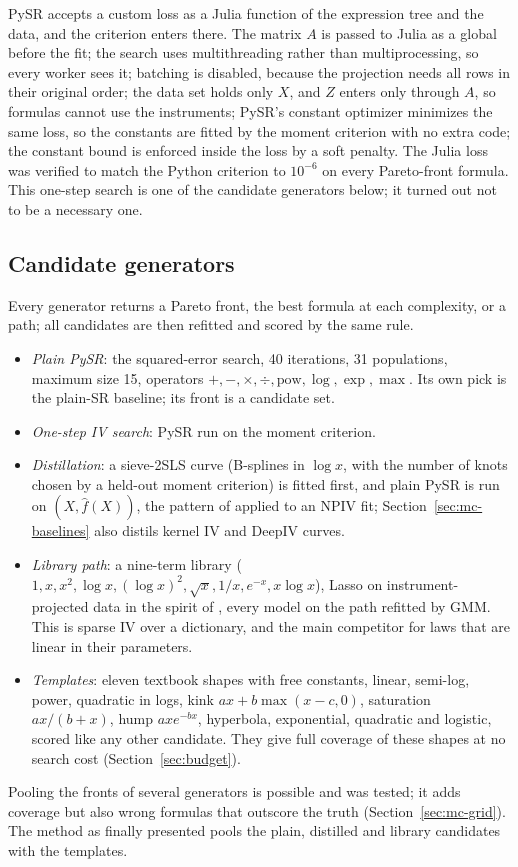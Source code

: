 PySR accepts a custom loss as a Julia function of the expression tree and the data, and the criterion enters there. The matrix $A$ is passed to Julia as a global before the fit; the search uses multithreading rather than multiprocessing, so every worker sees it; batching is disabled, because the projection needs all rows in their original order; the data set holds only $X$, and $Z$ enters only through $A$, so formulas cannot use the instruments; PySR's constant optimizer minimizes the same loss, so the constants are fitted by the moment criterion with no extra code; the constant bound is enforced inside the loss by a soft penalty. The Julia loss was verified to match the Python criterion to $10^{-6}$ on every Pareto-front formula. This one-step search is one of the candidate generators below; it turned out not to be a necessary one.

\subsection{Candidate generators}
\label{sec:generators}

Every generator returns a Pareto front, the best formula at each complexity, or a path; all candidates are then refitted and scored by the same rule.
\begin{itemize}
\item \emph{Plain PySR}: the squared-error search, 40 iterations, 31 populations, maximum size 15, operators $+, -, \times, \div, \mathrm{pow}, \log, \exp, \max$. Its own pick is the plain-SR baseline; its front is a candidate set.
\item \emph{One-step IV search}: PySR run on the moment criterion.
\item \emph{Distillation}: a sieve-2SLS curve (B-splines in $\log x$, with the number of knots chosen by a held-out moment criterion) is fitted first, and plain PySR is run on $(X, \hat f(X))$, the pattern of \citet{cranmer2020} applied to an NPIV fit; Section~\ref{sec:mc-baselines} also distils kernel IV \citep{singh2019} and DeepIV \citep{hartford2017} curves.
\item \emph{Library path}: a nine-term library ($1, x, x^2, \log x, (\log x)^2, \sqrt x, 1/x, e^{-x}, x\log x$), Lasso on instrument-projected data in the spirit of \citet{linfengli2015}, every model on the path refitted by GMM. This is sparse IV over a dictionary, and the main competitor for laws that are linear in their parameters.
\item \emph{Templates}: eleven textbook shapes with free constants, linear, semi-log, power, quadratic in logs, kink $ax + b\max(x - c, 0)$, saturation $ax/(b + x)$, hump $axe^{-bx}$, hyperbola, exponential, quadratic and logistic, scored like any other candidate. They give full coverage of these shapes at no search cost (Section~\ref{sec:budget}).
\end{itemize}
Pooling the fronts of several generators is possible and was tested; it adds coverage but also wrong formulas that outscore the truth (Section~\ref{sec:mc-grid}). The method as finally presented pools the plain, distilled and library candidates with the templates.

